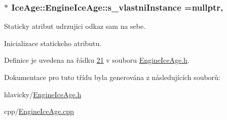 \subsubsection[{\texorpdfstring{s\+\_\+vlastni\+Instance}{s_vlastniInstance}}]{ $\ast$ Ice\+Age\+::\+Engine\+Ice\+Age\+::s\+\_\+vlastni\+Instance =nullptr\hspace{0.3cm}{\ttfamily [static]}, {\ttfamily [private]}}\hypertarget{classIceAge_1_1EngineIceAge_a3a28dd4c3cde5578060cf2463a9802c2}{}\label{classIceAge_1_1EngineIceAge_a3a28dd4c3cde5578060cf2463a9802c2}


Staticky atribut udrzujici odkaz sam na sebe. 

Inicializace statickeho atributu. 

Definice je uvedena na řádku \hyperlink{EngineIceAge_8h_source_l00021}{21} v souboru \hyperlink{EngineIceAge_8h_source}{Engine\+Ice\+Age.\+h}.



Dokumentace pro tuto třídu byla generována z následujících souborů\+:\begin{DoxyCompactItemize}
\item 
hlavicky/\hyperlink{EngineIceAge_8h}{Engine\+Ice\+Age.\+h}\item 
cpp/\hyperlink{EngineIceAge_8cpp}{Engine\+Ice\+Age.\+cpp}\end{DoxyCompactItemize}
